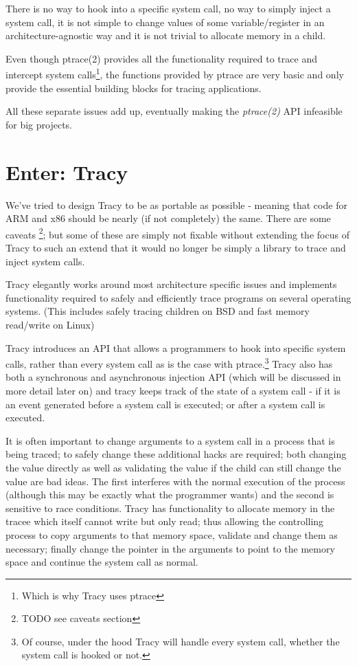 \documentclass[a4paper, twoside, 10pt, twocolumn]{report}
\begin{document}
There is no way to hook into a specific system call, no way
to simply inject a system call, it is not simple to change values of some
variable/register in an architecture-agnostic way and it is not trivial
to allocate memory in a child.

Even though ptrace(2) provides all the functionality required to trace and
intercept system calls\footnote{Which is why Tracy uses ptrace},
the functions provided by ptrace are very basic and only provide the
essential building blocks for tracing applications.

All these separate issues add up, eventually making the \textit{ptrace(2)} API
infeasible for big projects.

\section{Enter: Tracy}

We've tried to design Tracy to be as portable as possible - meaning that code
for ARM and x86 should be nearly (if not completely) the same. There are some
caveats \footnote{TODO see caveats section}; but some of these are simply not
fixable without extending the focus of Tracy to such an extend that it would no
longer be simply a library to trace and inject system calls.

Tracy elegantly works around most architecture specific issues and implements
functionality required to safely and efficiently trace programs on several
operating systems. (This includes safely tracing children on BSD and fast memory
read/write on Linux)

Tracy introduces an API that allows a programmers to hook into specific system
calls, rather than every system call as is the case with ptrace.\footnote{Of
course, under the hood Tracy will handle every system call, whether the system
call is hooked or not.}
Tracy also has both a synchronous and asynchronous injection API (which
will be discussed in more detail later on) and tracy keeps track of the state of
a system call - if it is an event generated before a system call is executed; or
after a system call is executed.

It is often important to change arguments to a system call in a process that is
being traced; to safely change these additional hacks are required;
both changing the value directly as well as validating the value if the child
can still change the value are bad ideas.
The first interferes with the normal execution of the process
(although this may be exactly what the programmer wants) and the second is
sensitive to race conditions. Tracy has functionality to allocate memory in the
tracee which itself cannot write but only read; thus allowing the controlling
process to copy arguments to that memory space, validate and change them as
necessary; finally change the pointer in the arguments to point to the memory
space and continue the system call as normal.
\end{document}
